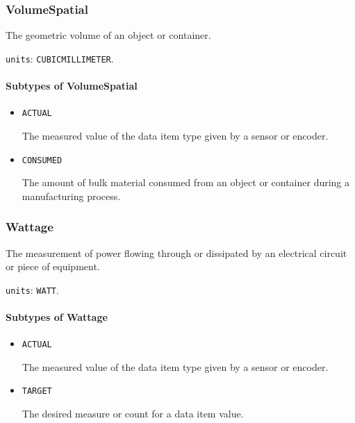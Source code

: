 \subsubsection{VolumeSpatial}
\label{sec:VolumeSpatial}



The geometric volume of an object or container.


\texttt{units}: \texttt{CUBIC\textunderscore MILLIMETER}.

\paragraph{Subtypes of VolumeSpatial}\mbox{}
\label{sec:Subtypes of VolumeSpatial}

\begin{itemize}

\item \texttt{ACTUAL}


The measured value of the data item type given by a sensor or encoder.

\item \texttt{CONSUMED}


The amount of bulk material consumed from an object or container during a manufacturing process.


\end{itemize}





\subsubsection{Wattage}
\label{sec:Wattage}



The measurement of power flowing through or dissipated by an electrical circuit or piece of equipment.


\texttt{units}: \texttt{WATT}.

\paragraph{Subtypes of Wattage}\mbox{}
\label{sec:Subtypes of Wattage}

\begin{itemize}

\item \texttt{ACTUAL}


The measured value of the data item type given by a sensor or encoder.

\item \texttt{TARGET}


The desired measure or count for a data item value.


\end{itemize}





